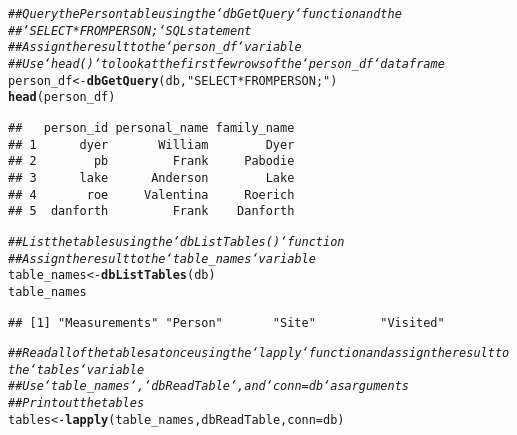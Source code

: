 \documentclass{article}\usepackage[]{graphicx}\usepackage[]{xcolor}
\makeatletter
\newcommand{\hlstr}[1]{\textcolor[rgb]{0.192,0.494,0.8}{#1}}%
\newcommand{\hlcom}[1]{\textcolor[rgb]{0.678,0.584,0.686}{\textit{#1}}}%
\newcommand{\hlstd}[1]{\textcolor[rgb]{0.345,0.345,0.345}{#1}}%
\newcommand{\hlkwb}[1]{\textcolor[rgb]{0.69,0.353,0.396}{#1}}%
\newcommand{\hlkwc}[1]{\textcolor[rgb]{0.333,0.667,0.333}{#1}}%
\newcommand{\hlkwd}[1]{\textcolor[rgb]{0.737,0.353,0.396}{\textbf{#1}}}%
\newenvironment{kframe}{%
 \def\at@end@of@kframe{}%
 \ifinner\ifhmode%
  \def\at@end@of@kframe{\end{minipage}}%
  \begin{minipage}{\columnwidth}%
 \fi\fi%
 \def\FrameCommand##1{\hskip\@totalleftmargin \hskip-\fboxsep
 \colorbox{shadecolor}{##1}\hskip-\fboxsep
     \hskip-\linewidth \hskip-\@totalleftmargin \hskip\columnwidth}%
 \MakeFramed {\advance\hsize-\width
   \@totalleftmargin\z@ \linewidth\hsize
   \@setminipage}}%
 {\par\unskip\endMakeFramed%
 \at@end@of@kframe}
\newenvironment{knitrout}{}{} %
\makeatother
\begin{document}
\begin{knitrout}
\begin{kframe}
\begin{alltt}
\hlcom{## Query the Person table using the `dbGetQuery` function and the}
\hlcom{## `SELECT * FROM PERSON;` SQL statement}
\hlcom{## Assign the result to the `person_df` variable}
\hlcom{## Use `head()` to look at the first few rows of the `person_df` dataframe}
\hlstd{person_df} \hlkwb{<-} \hlkwd{dbGetQuery}\hlstd{(db,}\hlstr{"SELECT * FROM PERSON;"}\hlstd{)}
\hlkwd{head}\hlstd{(person_df)}
\end{alltt}
\begin{verbatim}
##   person_id personal_name family_name
## 1      dyer       William        Dyer
## 2        pb         Frank     Pabodie
## 3      lake      Anderson        Lake
## 4       roe     Valentina     Roerich
## 5  danforth         Frank    Danforth
\end{verbatim}
\begin{alltt}
\hlcom{## List the tables using the `dbListTables()` function}
\hlcom{## Assign the result to the `table_names` variable}
\hlstd{table_names} \hlkwb{<-} \hlkwd{dbListTables}\hlstd{(db)}
\hlstd{table_names}
\end{alltt}
\begin{verbatim}
## [1] "Measurements" "Person"       "Site"         "Visited"
\end{verbatim}
\begin{alltt}
\hlcom{## Read all of the tables at once using the `lapply` function and assign the result to the `tables` variable}
\hlcom{## Use `table_names`, `dbReadTable`, and `conn = db` as arguments}
\hlcom{## Print out the tables}
\hlstd{tables} \hlkwb{<-} \hlkwd{lapply}\hlstd{(table_names,dbReadTable,}\hlkwc{conn} \hlstd{= db)}
\end{alltt}



\end{kframe}
\end{knitrout}
\end{document}
